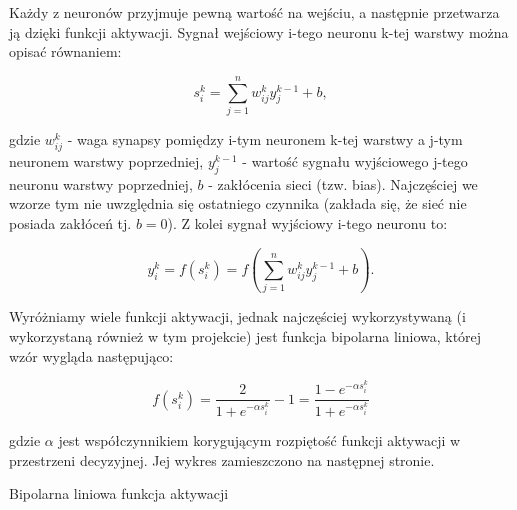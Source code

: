 \documentclass[12pt,a4paper]{article}
\begin{document}
	\vspace{5pt}
	Każdy z neuronów przyjmuje pewną wartość na wejściu, a następnie przetwarza ją dzięki funkcji aktywacji. Sygnał wejściowy i-tego neuronu k-tej warstwy można opisać równaniem:
	
	\begin{equation*}
	    s^k_i = \sum_{j=1}^{n}w^k_{ij} y^{k-1}_{j} + b,
	\end{equation*}
	
	\noindent gdzie $w^k_{ij}$ - waga synapsy pomiędzy i-tym neuronem k-tej warstwy a j-tym neuronem warstwy poprzedniej, $y^{k-1}_{j}$ - wartość sygnału wyjściowego j-tego neuronu warstwy poprzedniej, $b$ - zakłócenia sieci (tzw. bias). Najczęściej we wzorze tym nie uwzględnia się ostatniego czynnika (zakłada się, że sieć nie posiada zakłóceń tj. $b = 0$). Z kolei sygnał wyjściowy i-tego neuronu to:
	
	\begin{equation*}
	    y^k_i = f(s^k_i) = f(\sum_{j=1}^{n}w^k_{ij} y^{k-1}_{j} + b).
	\end{equation*}
	
	Wyróżniamy wiele funkcji aktywacji, jednak najczęściej wykorzystywaną (i wykorzystaną również w tym projekcie) jest funkcja bipolarna liniowa, której wzór wygląda następująco:
	
	\begin{equation*}
	    f(s^k_i) = \frac{2}{1 + e^{-\alpha s^k_i}} - 1 = \frac{1 - e^{-\alpha s^k_i}}{1 + e^{-\alpha s^k_i}}
	\end{equation*}
	
	\noindent gdzie $\alpha$ jest współczynnikiem korygującym rozpiętość funkcji aktywacji w przestrzeni decyzyjnej. Jej wykres zamieszczono na następnej stronie.

\begin{center}
\newline Bipolarna liniowa funkcja aktywacji
\end{center}
    
\end{document}
